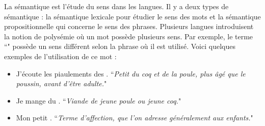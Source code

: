 \documentclass{KodeBook}
\begin{document}
La sémantique est l'étude du sens dans les langues. 
Il y a deux types de sémantique : la sémantique lexicale pour étudier le sens des mots et la sémantique propositionnelle qui concerne le sens des phrases.
Plusieurs langues introduisent la notion de polysémie où un mot possède plusieurs sens.
Par exemple, le terme ``" possède un sens différent selon la phrase où il est utilisé. 
Voici quelques exemples de l'utilisation de ce mot :
\begin{itemize}
	\item J'écoute les piaulements des . ``\textit{Petit du coq et de la poule, plus âgé que le poussin, avant d'être adulte.}"
	\item Je mange du . ``\textit{Viande de jeune poule ou jeune coq.}"
	\item Mon petit . ``\textit{Terme d'affection, que l'on adresse généralement aux enfants.}"
\end{itemize}
\end{document}
